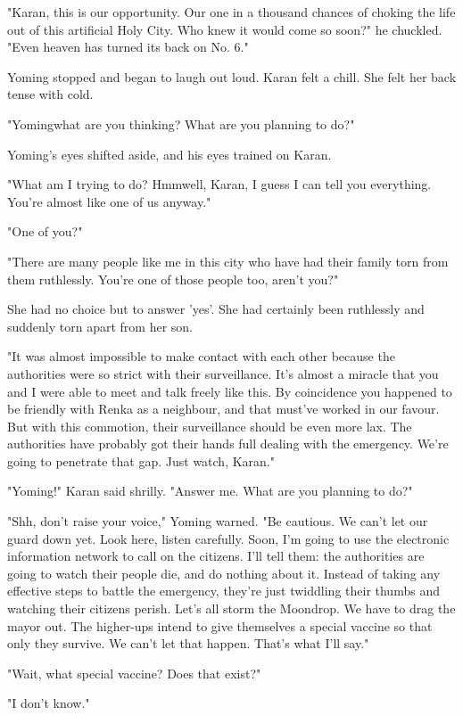 "Karan, this is our opportunity. Our one in a thousand chances of
choking the life out of this artificial Holy City. Who knew it would
come so soon?" he chuckled. "Even heaven has turned its back on No. 6."

Yoming stopped and began to laugh out loud. Karan felt a chill. She felt
her back tense with cold.

"Yoming\el what are you thinking? What are you planning to do?"

Yoming's eyes shifted aside, and his eyes trained on Karan.

"What am I trying to do? Hmm\el well, Karan, I guess I can tell you
everything. You're almost like one of us anyway."

"One of you\el ?"

"There are many people like me in this city who have had their family
torn from them ruthlessly. You're one of those people too, aren't you?"

She had no choice but to answer 'yes'. She had certainly been ruthlessly
and suddenly torn apart from her son.

"It was almost impossible to make contact with each other because the
authorities were so strict with their surveillance. It's almost a
miracle that you and I were able to meet and talk freely like this. By
coincidence you happened to be friendly with Renka as a neighbour, and
that must've worked in our favour. But with this commotion, their
surveillance should be even more lax. The authorities have probably got
their hands full dealing with the emergency. We're going to penetrate
that gap. Just watch, Karan."

"Yoming!" Karan said shrilly. "Answer me. What are you planning to do?"

"Shh, don't raise your voice," Yoming warned. "Be cautious. We can't let
our guard down yet. Look here, listen carefully. Soon, I'm going to use
the electronic information network to call on the citizens. I'll tell
them: the authorities are going to watch their people die, and do
nothing about it. Instead of taking any effective steps to battle the
emergency, they're just twiddling their thumbs and watching their
citizens perish. Let's all storm the Moondrop. We have to drag the mayor
out. The higher-ups intend to give themselves a special vaccine so that
only they survive. We can't let that happen. That's what I'll say."

"Wait, what special vaccine? Does that exist?"

"I don't know."

